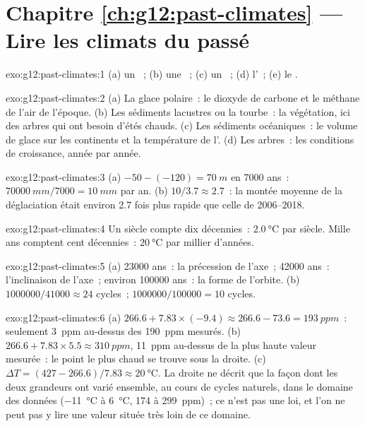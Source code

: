 \section*{Chapitre \ref{ch:g12:past-climates} --- Lire les climats du passé}

\begin{solution}{exo:g12:past-climates:1}
(a) un ~; (b) une ~; (c) un
~; (d) l'~; (e) le .
\end{solution}

\begin{solution}{exo:g12:past-climates:2}
(a) La glace polaire~: le dioxyde de carbone et le méthane de l'air de
l'époque. (b) Les sédiments lacustres ou la tourbe~: la végétation, ici des
arbres qui ont besoin d'étés chauds. (c) Les sédiments océaniques~: le
volume de glace sur les continents et la température de l'.
(d) Les arbres~: les conditions de croissance, année par année.
\end{solution}

\begin{solution}{exo:g12:past-climates:3}
(a) $-50 - (-120) = \qty{70}{m}$ en \num{7000} ans~: $\qty{70000}{mm}/\num{7000}
= \qty{10}{mm}$ par an. (b) $10/3.7 \approx 2.7$~: la montée moyenne de la
déglaciation était environ 2.7 fois plus rapide que celle de 2006--2018.
\end{solution}

\begin{solution}{exo:g12:past-climates:4}
Un siècle compte dix décennies~: $\qty{2.0}{\degreeCelsius}$ par siècle.
Mille ans comptent cent décennies~: $\qty{20}{\degreeCelsius}$ par millier
d'années.
\end{solution}

\begin{solution}{exo:g12:past-climates:5}
(a) \num{23000} ans~: la précession de l'axe~; \num{42000} ans~:
l'inclinaison de l'axe~; environ \num{100000} ans~: la forme de l'orbite.
(b) $\num{1000000}/\num{41000} \approx 24$ cycles~; $\num{1000000}/\num{100000}
= 10$ cycles.
\end{solution}

\begin{solution}{exo:g12:past-climates:6}
(a) $266.6 + 7.83 \times (-9.4) \approx 266.6 - 73.6 = \qty{193}{ppm}$~:
seulement \qty{3}{ppm} au-dessus des \qty{190}{ppm} mesurés. (b) $266.6 + 7.83 \times 5.5
\approx \qty{310}{ppm}$, \qty{11}{ppm} au-dessus de la plus haute valeur
mesurée~: le point le plus chaud se trouve sous la droite. (c) $\Delta T = (427 - 266.6)/7.83 \approx
\qty{20}{\degreeCelsius}$. La droite ne décrit que la façon dont les deux
grandeurs ont varié ensemble, au cours de cycles naturels, dans le domaine
des données (\qty{-11}{\degreeCelsius} à \qty{+6}{\degreeCelsius}, 174 à
\qty{299}{ppm})~; ce n'est pas une loi, et l'on ne peut pas y lire une
valeur située très loin de ce domaine.
\end{solution}

